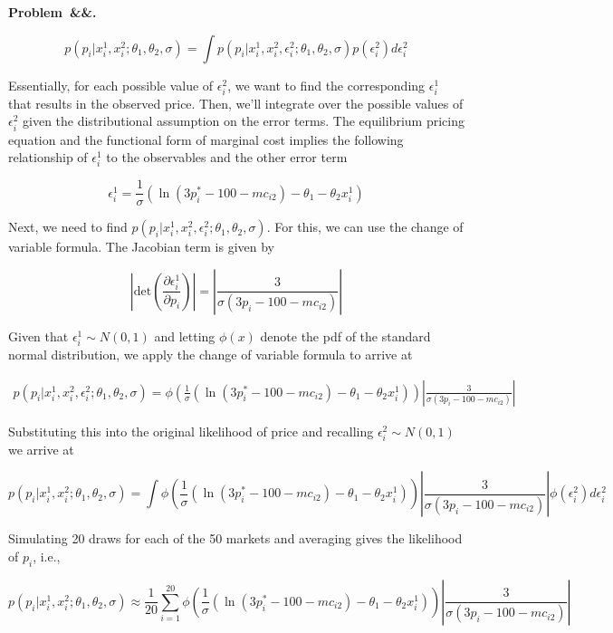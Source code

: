 \documentclass[12pt]{article}
\newcommand{\pd}[2]{\frac{\partial #1}{\partial #2}}  %
\newcounter{problem}
\newenvironment{problem}[1][]{
    \newpage %
    \refstepcounter{problem}\par\noindent
    \textbf{Problem~\theproblem\ifx&#1&\else.~#1\fi}\rmfamily\par\vspace{0.5em}
}{\vspace{1em}}
\begin{document}
\begin{problem}
\begin{subproblems}
        $$p(p_i|x_i^1, x_i^2; \theta_1, \theta_2, \sigma) = \int p(p_i|x_i^1, x_i^2, \epsilon_i^2; \theta_1, \theta_2, \sigma)p(\epsilon_i^2)d\epsilon_i^2$$

        Essentially, for each possible value of $\epsilon_i^2$, we want to find the corresponding $\epsilon_i^1$ that results in the observed price. Then, we'll integrate over the possible values of $\epsilon_i^2$ given the distributional assumption on the error terms. The equilibrium pricing equation and the functional form of marginal cost implies the following relationship of $\epsilon_i^1$ to the observables and the other error term

        $$\epsilon_i^1 = \frac{1}{\sigma}(\ln(3p_i^* - 100 - mc_{i2}) - \theta_1 - \theta_2 x_i^1)$$

        Next, we need to find $p(p_i|x_i^1, x_i^2, \epsilon_i^2; \theta_1, \theta_2, \sigma)$. For this, we can use the change of variable formula. The Jacobian term is given by 

        $$\left|\text{det}\left(\pd{\epsilon_i^1}{p_i}\right)\right| = \left|\frac{3}{\sigma(3p_i - 100 - mc_{i2})}\right|$$
        
        
        Given that $\epsilon_i^1 \sim N(0,1)$ and letting $\phi(x)$ denote the pdf of the standard normal distribution, we apply the change of variable formula to arrive at 

        \begin{align*}
            p(p_i|x_i^1, x_i^2, \epsilon_i^2; \theta_1, \theta_2, \sigma) = \phi\left(\frac{1}{\sigma}(\ln(3p_i^* - 100 - mc_{i2}) - \theta_1 - \theta_2 x_i^1)\right)\left|\frac{3}{\sigma(3p_i - 100 - mc_{i2})}\right|
        \end{align*}

        Substituting this into the original likelihood of price and recalling $\epsilon_i^2 \sim N(0,1)$ we arrive at 

        $$p(p_i|x_i^1, x_i^2; \theta_1, \theta_2, \sigma) = \int \phi\left(\frac{1}{\sigma}(\ln(3p_i^* - 100 - mc_{i2}) - \theta_1 - \theta_2 x_i^1)\right)\left|\frac{3}{\sigma(3p_i - 100 - mc_{i2})}\right|\phi(\epsilon_i^2)d\epsilon_i^2$$

        Simulating 20 draws for each of the 50 markets and averaging gives the likelihood of $p_i$, i.e., 

        $$p(p_i | x_i^1, x_i^2; \theta_1, \theta_2, \sigma) \approx \frac{1}{20}\sum_{i=1}^{20}\phi\left(\frac{1}{\sigma}(\ln(3p_i^* - 100 - mc_{i2}) - \theta_1 - \theta_2 x_i^1)\right)\left|\frac{3}{\sigma(3p_i - 100 - mc_{i2})}\right|$$


\end{subproblems}
\end{problem}
\end{document}
